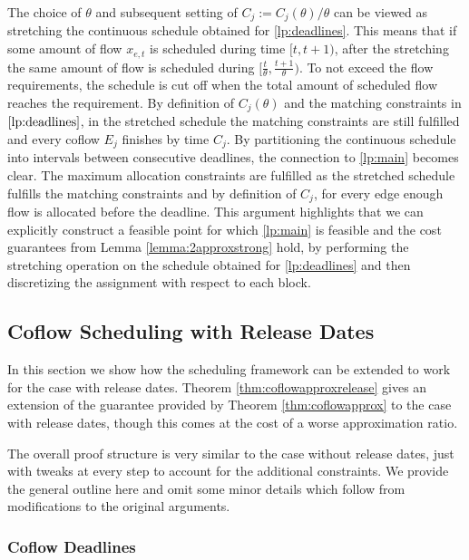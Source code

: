 \documentclass[11pt]{article}
\begin{document}
The choice of $\theta$ and subsequent setting of $C_j := C_j(\theta)/\theta$ can be viewed as stretching the continuous schedule obtained for \ref{lp:deadlines}. This means that if some amount of flow $x_{e,t}$ is scheduled during time $[t,t+1)$, after the stretching the same amount of flow is scheduled during $[\frac{t}{\theta},\frac{t+1}{\theta})$. To not exceed the flow requirements, the schedule is cut off when the total amount of scheduled flow reaches the requirement. By definition of $C_j(\theta)$ and the matching constraints in $\ref{lp:deadlines}$, in the stretched schedule the matching constraints are still fulfilled and every coflow $E_j$ finishes by time $C_j$. By partitioning the continuous schedule into intervals between consecutive deadlines, the connection to \ref{lp:main} becomes clear. The maximum allocation constraints are fulfilled as the stretched schedule fulfills the matching constraints and by definition of $C_j$, for every edge enough flow is allocated before the deadline. This argument highlights that we can explicitly construct a feasible point for which \ref{lp:main} is feasible and the cost guarantees from Lemma \ref{lemma:2approxstrong} hold, by performing the stretching operation on the schedule obtained for \ref{lp:deadlines} and then discretizing the assignment with respect to each block.

\subsection{Coflow Scheduling with Release Dates}\label{sec:app:frameworkrelease}
In this section we show how the scheduling framework can be extended to work for the case with release dates. Theorem \ref{thm:coflowapproxrelease} gives an extension of the guarantee provided by Theorem \ref{thm:coflowapprox} to the case with release dates, though this comes at the cost of a worse approximation ratio.

\rsthmcoflowapproxrelease*

The overall proof structure is very similar to the case without release dates, just with tweaks at every step to account for the additional constraints. We provide the general outline here and omit some minor details which follow from modifications to the original arguments.

\subsubsection*{Coflow Deadlines}
\end{document}
